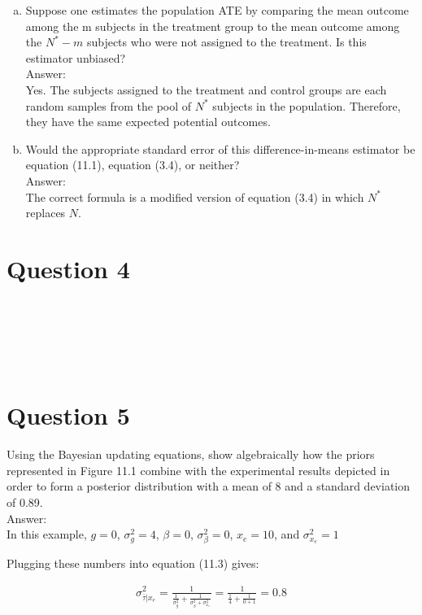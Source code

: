 \documentclass[11pt,notitlepage]{article}\usepackage[]{graphicx}\usepackage[]{color}
\makeatletter
\newenvironment{kframe}{%
 \def\at@end@of@kframe{}%
 \ifinner\ifhmode%
  \def\at@end@of@kframe{\end{minipage}}%
  \begin{minipage}{\columnwidth}%
 \fi\fi%
 \def\FrameCommand##1{\hskip\@totalleftmargin \hskip-\fboxsep
 \colorbox{shadecolor}{##1}\hskip-\fboxsep
     \hskip-\linewidth \hskip-\@totalleftmargin \hskip\columnwidth}%
 \MakeFramed {\advance\hsize-\width
   \@totalleftmargin\z@ \linewidth\hsize
   \@setminipage}}%
 {\par\unskip\endMakeFramed%
 \at@end@of@kframe}
\newenvironment{knitrout}{}{} %
\makeatother
\begin{document}
\begin{enumerate}[a)]
\item Suppose one estimates the population ATE by comparing the mean outcome among the m subjects in the treatment group to the mean outcome among the $N^* - m$ subjects who were not assigned to the treatment. Is this estimator unbiased?\\
Answer:\\
Yes. The subjects assigned to the treatment and control groups are each random samples from the pool of $N^*$ subjects in the population.  Therefore, they have the same expected potential outcomes.
\item Would the appropriate standard error of this difference-in-means estimator be equation (11.1), equation (3.4), or neither?\\
Answer:\\
The correct formula is a modified version of equation (3.4) in which $N^*$ replaces $N$.
\end{enumerate}


\section*{Question 4}
\begin{knitrout}
\color{fgcolor}\begin{kframe}
\begin{verbatim}






\end{verbatim}
\end{kframe}
\end{knitrout}


\section*{Question 5}
Using the Bayesian updating equations, show algebraically how the priors represented in Figure 11.1 combine with the experimental results depicted in order to form a posterior distribution with a mean of 8 and a standard deviation of 0.89.\\
Answer:\\
In this example, $g=0$, $\sigma^2_g = 4$, $\beta = 0$, $\sigma^2_{\beta} = 0$, $x_e = 10$, and $\sigma^2_{x_e} = 1$

Plugging these numbers into equation (11.3) gives: 

 \begin{align*}
\sigma^2_{\bar{\tau}|x_e} = \frac{1}{\frac{1}{\sigma^2_g} + \frac{1}{\sigma^2_{\beta} + \sigma^2_{x_e}}} = \frac{1}{\frac{1}{4} + \frac{1}{0+1}} = 0.8
\end{align*}
 
\end{document}
